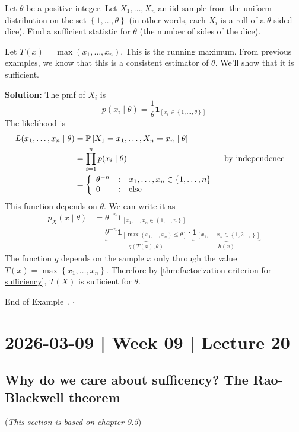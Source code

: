 \documentclass[10pt]{article}
\theoremstyle{definition}
\newtheorem{example}[theorem]{Example}
\renewenvironment{example}
{\begin{oldexample}}
  {\par\smallskip\hfill   End of Example~\theexample. $\square$    \par\end{oldexample}}
\newcommand{\vt}{\vskip 5mm} %
\newcommand{\Fl}{\vt\noindent\textbf} %
\newcommand{\1}[1]{\textbf{1}_{\left[#1\right]}} %
\def\P{\mathbb{P}} %
\begin{document}
\begin{example}
  Let $\theta$ be a positive integer. Let $X_{1},\ldots,X_{n}$ an iid sample
  from the uniform distribution on the set $\left\{1,\ldots,\theta\right\}$
  (in other words, each $X_{i}$ is a roll of a $\theta$-sided dice). Find a
  sufficient statistic for $\theta$ (the number of sides of the dice).


  Let $T(x) = \max \left(x_{1},\ldots,x_{n}\right)$. This is the running
  maximum. From previous examples, we know that this is a consistent estimator
  of $\theta$. We'll show that it is sufficient.
  
  \Fl{Solution:} The pmf of $X_{i}$ is
  \begin{equation*}
    p(x_{i}\mid \theta) = \frac{1}{\theta}\mathbf{1}_{\left[x_{i}\in \left\{1,\ldots,\theta\right\} \right] }
  \end{equation*}
  The likelihood is
  \begin{align*}
    L(x_{1},\ldots,x_{n}\mid \theta) 
    &= \P\left[X_{1}=x_{1},\ldots,X_{n}=x_{n}\mid \theta \right] \\
    &= \prod_{i=1}^{n}p(x_{i}\mid \theta) &&\text{by independence}\\ 
    &= \left\{ \begin{array}{l@{\quad:\quad}l} \theta^{-n} & x_{1},\ldots,x_{n}\in \left\{1,\ldots,n\right\} \\ 0& \text{else} \end{array}\right.
  \end{align*}
  This function depends on $\theta$. We can write it as
  \begin{align*}
    p_{X}(x\mid \theta) 
    &= \theta^{-n}\mathbf{1}_{\left[ x_{1},\ldots,x_{n}\in \left\{1,\ldots,n\right\}  \right] }\\
    &= \underbrace{\theta^{-n}\mathbf{1}_{\left[ \max(x_{1},\ldots,x_{n}) \leq \theta\right] }}_{g(T(x),\theta)}\cdot\underbrace{\mathbf{1}_{\left[ x_{1},\ldots,x_{n}\in \left\{1,2\ldots,\right\}  \right] }}_{h(x)}
  \end{align*}
  The function $g$ depends on the sample $x$ only through the value $T(x)=\max
  \left\{x_{1},\ldots,x_{n}\right\}$. Therefore by
  \cref{thm:factorization-criterion-for-sufficiency}, $T(X)$ is sufficient for $\theta$.
\end{example}
\newpage
\section{2026-03-09 | Week 09 | Lecture 20}
\subsection{Why do we care about sufficency? The Rao-Blackwell theorem}
(\textit{This section is based on chapter 9.5})
\end{document}
